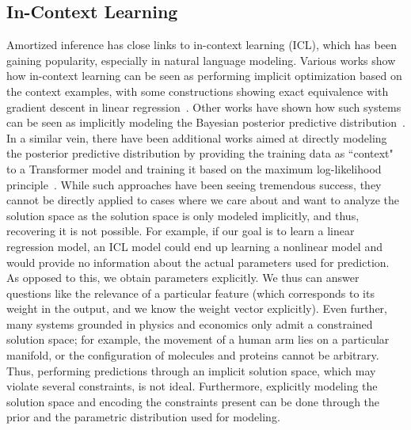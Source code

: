 \subsection{In-Context Learning}
Amortized inference has close links to in-context learning (ICL), which has been gaining popularity, especially in natural language modeling. Various works show how in-context learning can be seen as performing implicit optimization based on the context examples, with some constructions showing exact equivalence with gradient descent in linear regression~\citep{von2023transformers,von2023uncovering}. Other works have shown how such systems can be seen as implicitly modeling the Bayesian posterior predictive distribution~\citep{muller2021transformers}. In a similar vein, there have been additional works aimed at directly modeling the posterior predictive distribution by providing the training data as ``context" to a Transformer model and training it based on the maximum log-likelihood principle~\citep{hollmann2022tabpfn}. While such approaches have been seeing tremendous success, they cannot be directly applied to cases where we care about and want to analyze the solution space as the solution space is only modeled implicitly, and thus, recovering it is not possible. For example, if our goal is to learn a linear regression model, an ICL model could end up learning a nonlinear model and would provide no information about the actual parameters used for prediction. As opposed to this, we obtain parameters explicitly. We thus can answer questions like the relevance of a particular feature (which corresponds to its weight in the output, and we know the weight vector explicitly). Even further, many systems grounded in physics and economics only admit a constrained solution space; for example, the movement of a human arm lies on a particular manifold, or the configuration of molecules and proteins cannot be arbitrary. Thus, performing predictions through an implicit solution space, which may violate several constraints, is not ideal. Furthermore, explicitly modeling the solution space and encoding the constraints present can be done through the prior and the parametric distribution used for modeling. 









